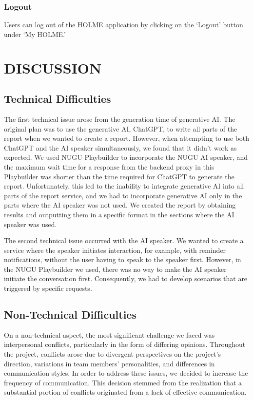 \documentclass[conference]{IEEEtran}
\begin{document}
\subsubsection{Logout}
Users can log out of the HOLME application by clicking on the `Logout' button under `My HOLME.'
\clearpage

\section{DISCUSSION}
\subsection{Technical Difficulties}
The first technical issue arose from the generation time of generative AI. The original plan was to use the generative AI, ChatGPT, to write all parts of the report when we wanted to create a report. However, when attempting to use both ChatGPT and the AI speaker simultaneously, we found that it didn't work as expected. We used NUGU Playbuilder to incorporate the NUGU AI speaker, and the maximum wait time for a response from the backend proxy in this Playbuilder was shorter than the time required for ChatGPT to generate the report. Unfortunately, this led to the inability to integrate generative AI into all parts of the report service, and we had to incorporate generative AI only in the parts where the AI speaker was not used. We created the report by obtaining results and outputting them in a specific format in the sections where the AI speaker was used.

The second technical issue occurred with the AI speaker. We wanted to create a service where the speaker initiates interaction, for example, with reminder notifications, without the user having to speak to the speaker first. However, in the NUGU Playbuilder we used, there was no way to make the AI speaker initiate the conversation first. Consequently, we had to develop scenarios that are triggered by specific requests.\\

\subsection{Non-Technical Difficulties}
On a non-technical aspect, the most significant challenge we faced was interpersonal conflicts, particularly in the form of differing opinions. Throughout the project, conflicts arose due to divergent perspectives on the project's direction, variations in team members' personalities, and differences in communication styles. In order to address these issues, we decided to increase the frequency of communication. This decision stemmed from the realization that a substantial portion of conflicts originated from a lack of effective communication.
\end{document}
